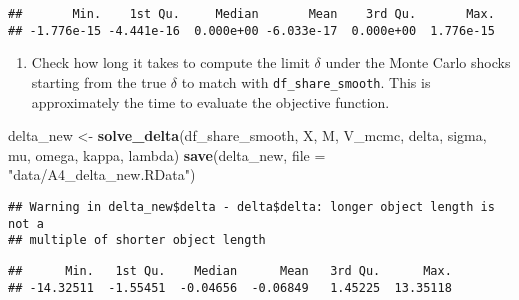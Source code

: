 \documentclass[
]{book}
\newenvironment{Shaded}{\begin{snugshade}}{\end{snugshade}}
\newcommand{\DataTypeTok}[1]{\textcolor[rgb]{0.13,0.29,0.53}{#1}}
\newcommand{\KeywordTok}[1]{\textcolor[rgb]{0.13,0.29,0.53}{\textbf{#1}}}
\newcommand{\NormalTok}[1]{#1}
\newcommand{\OperatorTok}[1]{\textcolor[rgb]{0.81,0.36,0.00}{\textbf{#1}}}
\newcommand{\StringTok}[1]{\textcolor[rgb]{0.31,0.60,0.02}{#1}}
\providecommand{\tightlist}{%
  \setlength{\itemsep}{0pt}\setlength{\parskip}{0pt}}
\begin{document}
\begin{verbatim}
##       Min.    1st Qu.     Median       Mean    3rd Qu.       Max. 
## -1.776e-15 -4.441e-16  0.000e+00 -6.033e-17  0.000e+00  1.776e-15
\end{verbatim}

\begin{enumerate}
\def\labelenumi{\arabic{enumi}.}
\setcounter{enumi}{8}
\tightlist
\item
  Check how long it takes to compute the limit \(\delta\) under the Monte Carlo shocks starting from the true \(\delta\) to match with \texttt{df\_share\_smooth}. This is approximately the time to evaluate the objective function.
\end{enumerate}

\begin{Shaded}
\begin{Highlighting}[]
\NormalTok{delta_new <-}
\StringTok{  }\KeywordTok{solve_delta}\NormalTok{(df_share_smooth, X, M, V_mcmc, delta, sigma, mu, omega, kappa, lambda)}
\KeywordTok{save}\NormalTok{(delta_new, }\DataTypeTok{file =} \StringTok{"data/A4_delta_new.RData"}\NormalTok{)}
\end{Highlighting}
\end{Shaded}

\begin{Shaded}
\end{Shaded}

\begin{verbatim}
## Warning in delta_new$delta - delta$delta: longer object length is not a
## multiple of shorter object length
\end{verbatim}

\begin{verbatim}
##      Min.   1st Qu.    Median      Mean   3rd Qu.      Max. 
## -14.32511  -1.55451  -0.04656  -0.06849   1.45225  13.35118
\end{verbatim}
\end{document}
